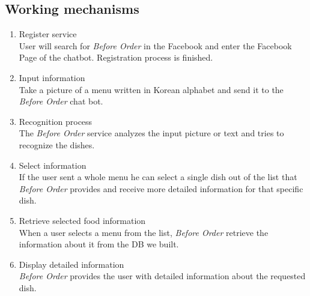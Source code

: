 \subsection{Working mechanisms}
\begin{enumerate}
\item Register service\\
User will search for \emph{Before Order} in the Facebook and enter the Facebook Page of the chatbot. Registration process is finished.
\item Input information\\
Take a picture of a menu written in Korean alphabet and send it to the \emph{Before Order} chat bot.
\item Recognition process\\
The \emph{Before Order} service analyzes the input picture or text and tries to recognize the dishes.
\item Select information\\
If the user sent a whole menu he can select a single dish out of the list that \emph{Before Order} provides and receive more detailed information for that specific dish.
\item Retrieve selected food information\\When a user selects a menu from the list, \emph{Before Order} retrieve the information about it from the DB we built. 
\item Display detailed information\\\emph{Before Order} provides the user with detailed information
about the requested dish.

\end{enumerate}